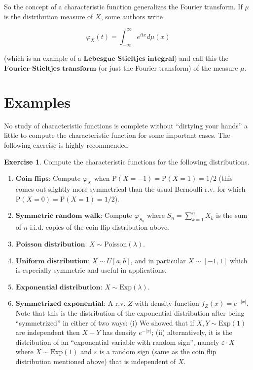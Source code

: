 \documentclass[11pt]{report}
\theoremstyle{plain}
\theoremstyle{definition}
\newtheorem{xexercise}[thm]{Exercise}
\begin{document}
So the concept of a characteristic function
generalizes the Fourier transform. If $\mu$ is the
distribution measure of $X$, some authors write

\[
\varphi_X(t) = \int_{-\infty}^\infty e^{itx} d\mu(x)
\]

(which is an example of a
$\textbf{Lebesgue-Stieltjes integral}$) and call this
the $\textbf{Fourier-Stieltjes transform}$ (or just
the Fourier transform) of the measure $\mu$.

\section{Examples}
No study of characteristic functions is complete
without ``dirtying your hands'' a little to compute
the characteristic function for some important cases.
The following exercise is highly recommended

\begin{xexercise}
Compute the characteristic functions for the
following distributions.

\begin{enumerate}[label=\arabic*.]
\item $\textbf{Coin flips:}$ Compute $\varphi_X$ when
$\mathrm{P}(X=-1)=\mathrm{P}(X=1)=1/2$ (this comes
out slightly more symmetrical than the usual Bernoulli
r.v. for which $\mathrm{P}(X=0)=\mathrm{P}(X=1)=1/2$).

\item $\textbf{Symmetric random walk:}$ Compute
$\varphi_{S_n}$ where $S_n=\sum_{k=1}^n X_k$ is the
sum of $n$ i.i.d. copies of the coin flip
distribution above.

\item $\textbf{Poisson distribution:}$
$X\sim \textrm{Poisson}(\lambda)$.

\item $\textbf{Uniform distribution:}$ $X \sim U[a,b]$, and
in particular $X\sim [-1,1]$ which is especially
symmetric and useful in applications.

\item $\textbf{Exponential distribution:}$
$X\sim \textrm{Exp}(\lambda)$.

\item $\textbf{Symmetrized exponential:}$ A r.v. $Z$ with
density function $f_Z(x) = e^{-|x|}$. Note that this
is the distribution of the exponential distribution
after being ``symmetrized'' in either of two ways: (i)
We showed that if $X,Y\sim \textrm{Exp}(1)$ are
independent then $X-Y$ has density $e^{-|x|}$; (ii)
alternatively, it is the distribution of an
``exponential variable with random sign'', namely
$\varepsilon\cdot X$ where $X\sim \textrm{Exp}(1)$
and $\varepsilon$ is a random sign (same as the coin
flip distribution mentioned above) that is independent
of $X$.
\end{enumerate}

\end{xexercise}
\end{document}

